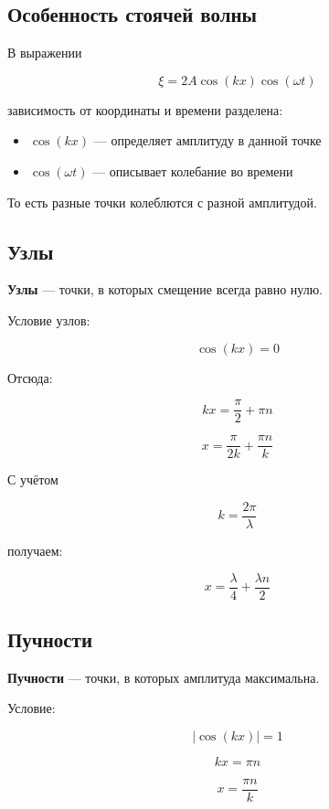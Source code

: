 \documentclass[a4paper,12pt]{article}
\begin{document}
\subsection*{Особенность стоячей волны}

В выражении

\[
\xi = 2A \cos(kx)\cos(\omega t)
\]

зависимость от координаты и времени разделена:

\begin{itemize}
\item \(\cos(kx)\) — определяет амплитуду в данной точке
\item \(\cos(\omega t)\) — описывает колебание во времени
\end{itemize}

То есть разные точки колеблются с разной амплитудой.

\subsection*{Узлы}

\begin{definitionbox}
\textbf{Узлы} — точки, в которых смещение всегда равно нулю.
\end{definitionbox}

Условие узлов:

\[
\cos(kx) = 0
\]

Отсюда:

\[
kx = \frac{\pi}{2} + \pi n
\]

\[
x =
\frac{\pi}{2k}
+
\frac{\pi n}{k}
\]

С учётом

\[
k = \frac{2\pi}{\lambda}
\]

получаем:

\[
x =
\frac{\lambda}{4}
+
\frac{\lambda n}{2}
\]

\subsection*{Пучности}

\begin{definitionbox}
\textbf{Пучности} — точки, в которых амплитуда максимальна.
\end{definitionbox}

Условие:

\[
|\cos(kx)| = 1
\]

\[
kx = \pi n
\]

\[
x =
\frac{\pi n}{k}
\]
\end{document}
